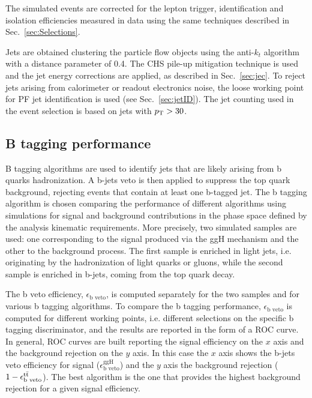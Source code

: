 The simulated events are corrected for the lepton trigger, identification and isolation efficiencies measured in data using the same techniques described in Sec.~\ref{sec:Selections}.

Jets are obtained clustering the particle flow objects using the anti-$k_t$ algorithm with a distance parameter of 0.4. The CHS pile-up mitigation technique is used and the jet energy corrections are applied, as described in Sec.~\ref{sec:jec}. 
To reject jets arising from calorimeter or readout electronics noise, the loose working point for PF jet identification is used (see Sec.~\ref{sec:jetID}). The jet counting used in the event selection is based on jets with $p_\mathrm{T}>30$\GeV.

\subsection{B tagging performance}

B tagging algorithms are used to identify jets that are likely arising from b quarks hadronization. A b-jets veto is then applied to suppress the top quark background, rejecting events that contain at least one b-tagged jet.
The b tagging algorithm is chosen comparing the performance of different algorithms using simulations for signal and background contributions in the phase space defined by the analysis kinematic requirements. More precisely, two simulated samples are used: one corresponding to the \hwwllnn signal produced via the ggH mechanism and the other to the \ttbar background process. The first sample is enriched in light jets, i.e. originating by the hadronization of light quarks or gluons, while the second sample is enriched in b-jets, coming from the top quark decay. 

The b veto efficiency, $\epsilon_\text{b veto}$, is computed separately for the two samples and for various b tagging algorithms. To compare the b tagging performance, $\epsilon_\text{b veto}$ is computed for different working points, i.e. different selections on the specific b tagging discriminator, and the results are reported in the form of a ROC curve. In general, ROC curves are built reporting the signal efficiency on the $x$ axis and the background rejection on the $y$ axis. In this case the $x$ axis shows the b-jets veto efficiency for signal ($\epsilon_\text{b veto}^\text{ggH}$) and the $y$ axis the \ttbar background rejection ($1-\epsilon_\text{b veto}^{\mathrm{t}\bar{\mathrm{t}}}$). The best algorithm is the one that provides the highest background rejection for a given signal efficiency. 

